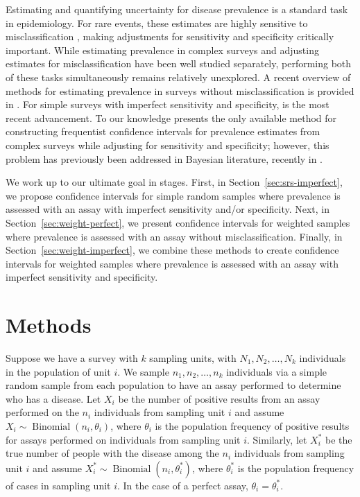 \documentclass[AMA,STIX1COL]{WileyNJD-v2}
\begin{document}
Estimating and quantifying uncertainty for disease prevalence is a standard task in epidemiology.
For rare events, these estimates are highly sensitive to misclassification \cite{hemenwaySelfDefense}, making adjustments for sensitivity and specificity critically important.
While estimating prevalence in complex surveys and adjusting estimates for misclassification have been well studied separately, performing both of these tasks simultaneously remains relatively unexplored.
A recent overview of methods for estimating prevalence in surveys without misclassification is provided in \cite{Dean:2015}.
For simple surveys with imperfect sensitivity and specificity, \cite{Lang:2014} is the most recent advancement.
To our knowledge \cite{Kali:2021} presents the only available method for constructing frequentist confidence intervals for prevalence estimates from complex surveys while adjusting for sensitivity and specificity; however,
this problem has previously been addressed in Bayesian literature, recently in \cite{GelmanBayes}.

We work up to our ultimate goal in stages.
First, in Section~\ref{sec:srs-imperfect}, we propose confidence intervals for simple random samples where prevalence is assessed with an assay with imperfect sensitivity and/or specificity.
Next, in Section~\ref{sec:weight-perfect}, we present confidence intervals for weighted samples where prevalence is assessed with an assay without misclassification.
Finally, in Section~\ref{sec:weight-imperfect}, we combine these methods to create confidence intervals for weighted samples where prevalence is assessed with an assay with imperfect sensitivity and specificity.


\section{Methods}

Suppose we have a survey with  \( k \) sampling units, with \( N_1, N_2, \ldots, N_k \) individuals in the population of unit \( i \).
We sample \( n_1, n_2, \ldots, n_k \) individuals via a simple random sample from each population to have an assay performed to determine who has a disease.
Let \( X_i \) be the number of positive results from an assay performed on the \( n_i \) individuals from sampling unit \( i \) and assume \( X_i \sim \operatorname{Binomial}(n_i, \theta_i) \), where \( \theta_i \) is the population frequency of positive results for assays performed on individuals from sampling unit \( i \).
Similarly, let \( X_i^* \) be the true number of people with the disease among the \( n_i \) individuals from sampling unit \( i \) and assume \( X_i^* \sim \operatorname{Binomial}(n_i, \theta_i^*) \), where \( \theta_i^* \) is the population frequency of cases in sampling unit \( i \).
In the case of a perfect assay, \( \theta_i = \theta_i^* \).
\end{document}
